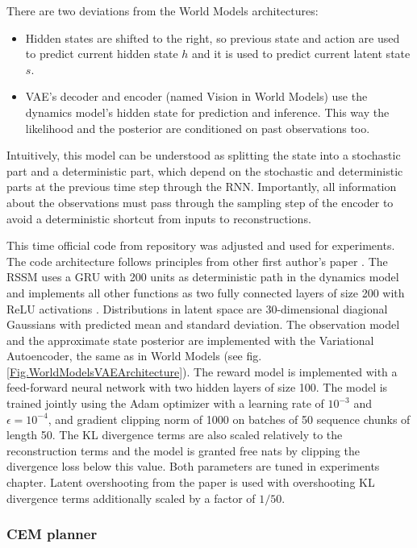 \noindent There are two deviations from the World Models architectures:
\begin{itemize}
\item Hidden states are shifted to the right, so previous state and action are used to predict current hidden state $h$ and it is used to predict current latent state $s$.
\item VAE's decoder and encoder (named Vision in World Models) use the dynamics model's hidden state for prediction and inference. This way the likelihood and the posterior are conditioned on past observations too.
\end{itemize}

Intuitively, this model can be understood as splitting the state into a stochastic part and a deterministic part, which depend on the stochastic and deterministic parts at the previous time step through the RNN. Importantly, all information about the observations must pass through the sampling step of the encoder to avoid a deterministic shortcut from inputs to reconstructions.

This time official code from repository \cite{Code.PlaNet} was adjusted and used for experiments. The code architecture follows principles from other first author's paper \cite{Code.TFAgents}.
The RSSM uses a GRU \cite{Algo.GRU} with 200 units as deterministic path in the dynamics model and implements all other functions as two fully connected layers of size 200 with ReLU activations \cite{Algo.ReLU}. Distributions in latent space are 30-dimensional diagional Gaussians with predicted mean and standard deviation.
The observation model and the approximate state posterior are implemented with the Variational Autoencoder, the same as in World Models (see fig.\ref{Fig.WorldModelsVAEArchitecture}). The reward model is implemented with a feed-forward neural network with two hidden layers of size 100.
The model is trained jointly using the Adam optimizer \cite{Algo.Adam} with a learning rate of $10^{-3}$ and $\epsilon = 10^{−4}$, and gradient clipping norm of 1000 on batches of 50 sequence chunks of length 50. The KL divergence terms are also scaled relatively to the reconstruction terms and the model is granted free nats by clipping the divergence loss below this value. Both parameters are tuned in experiments chapter. Latent overshooting from the paper \cite{Algo.PlaNet} is used with overshooting KL divergence terms additionally scaled by a factor of $1/50$.

\subsubsection{CEM planner}

